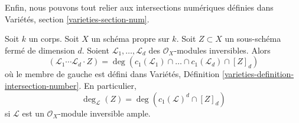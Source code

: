 \noindent
Enfin, nous pouvons tout relier aux intersections numériques
définies dans Variétés, section \ref{varieties-section-num}.

\begin{lemma}
\label{lemma-degrees-and-numerical-intersections}
Soit $k$ un corps. Soit $X$ un schéma propre sur $k$.
Soit $Z \subset X$ un sous-schéma fermé de dimension $d$.
Soient $\mathcal{L}_1, \ldots, \mathcal{L}_d$ des
$\mathcal{O}_X$-modules inversibles. Alors
$$
(\mathcal{L}_1 \cdots \mathcal{L}_d \cdot Z) =
\deg(
c_1(\mathcal{L}_1) \cap \ldots \cap c_1(\mathcal{L}_d) \cap [Z]_d)
$$
où le membre de gauche est défini dans
Variétés, Définition \ref{varieties-definition-intersection-number}.
En particulier,
$$
\deg_\mathcal{L}(Z) = \deg(c_1(\mathcal{L})^d \cap [Z]_d)
$$
si $\mathcal{L}$ est un $\mathcal{O}_X$-module inversible ample.
\end{lemma}

